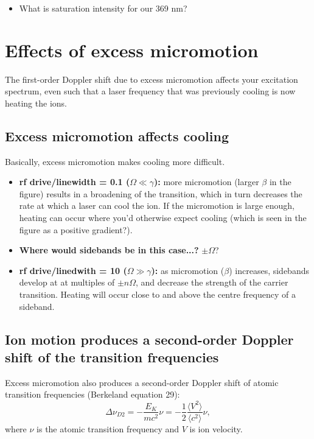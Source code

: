 \documentclass{article}
\begin{document}
\begin{itemize}
\item What is saturation intensity for our 369 nm?
\end{itemize}


\section{Effects of excess micromotion}

The first-order Doppler shift due to excess micromotion affects your excitation spectrum, even such that a laser frequency that was previously cooling is now heating the ions.

\subsection*{Excess micromotion affects cooling}

Basically, excess micromotion makes cooling more difficult.

\begin{itemize}
\item \textbf{rf drive/linewidth = 0.1 ($\Omega \ll \gamma$):} more micromotion (larger $\beta$ in the figure) results in a broadening of the transition, which in turn decreases the rate at which a laser can cool the ion. If the micromotion is large enough, heating can occur where you'd otherwise expect cooling (which is seen in the figure as a positive gradient?). 

\item \textbf{Where would sidebands be in this case...?} $\pm \Omega$?

\item \textbf{rf drive/linedwith = 10 ($\Omega \gg \gamma$):} as micromotion ($\beta$) increases, sidebands develop at at multiples of $\pm n\Omega$, and decrease the strength of the carrier transition. Heating will occur close to and above the centre frequency of a sideband.
\end{itemize}


\subsection*{Ion motion produces a second-order Doppler shift of the transition frequencies}

Excess micromotion also produces a second-order Doppler shift of atomic transition frequencies (Berkeland equation 29):
%
\begin{equation}
\Delta \nu_{D2} = - \frac{E_K}{mc^2} \nu = -\frac{1}{2} \frac{\langle V^2 \rangle}{\langle c^2 \rangle} \nu,
\end{equation}
%
where $\nu$ is the atomic transition frequency and $V$ is ion velocity.
\end{document}
